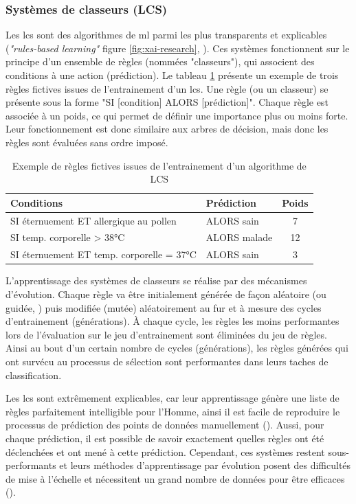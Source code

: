 \subsubsection{Systèmes de classeurs (LCS)}
Les \gls{lcs} sont des algorithmes de \gls{ml} parmi les plus transparents et explicables (\textit{"rules-based learning"} figure \ref{fig:xai-research}, \cite{arrieta_explainable_2019}). Ces systèmes fonctionnent sur le principe d'un ensemble de règles (nommées "classeurs"), qui associent des conditions à une action (prédiction). Le tableau \ref{table:lcs-rules} présente un exemple de trois règles fictives issues de l'entrainement d'un \gls{lcs}. Une règle (ou un classeur) se présente sous la forme "SI [condition] ALORS [prédiction]". Chaque règle est associée à un poids, ce qui permet de définir une importance plus ou moins forte. Leur fonctionnement est donc similaire aux arbres de décision, mais donc les règles sont évaluées sans ordre imposé.
\begin{table}[!ht]
\centering
\begin{tabular}{|l|l|c|} 
 \hline
 Conditions & Prédiction & Poids \\
 \hline
 SI éternuement ET allergique au pollen & ALORS sain & 7 \\ 
 SI temp. corporelle > 38°C & ALORS malade & 12 \\ 
 SI éternuement ET temp. corporelle = 37°C & ALORS sain & 3 \\ 

 \hline
\end{tabular}
\caption{Exemple de règles fictives issues de l'entrainement d'un algorithme de LCS}
\label{table:lcs-rules}
\end{table}

L'apprentissage des systèmes de classeurs se réalise par des mécanismes d'évolution. Chaque règle va être initialement générée de façon aléatoire (ou guidée, \cite{urbanowicz_relief-based_2018}) puis modifiée (mutée) aléatoirement au fur et à mesure des cycles d'entrainement (générations). À chaque cycle, les règles les moins performantes lors de l'évaluation sur le jeu d'entrainement sont éliminées du jeu de règles. Ainsi au bout d'un certain nombre de cycles (générations), les règles générées qui ont survécu au processus de sélection sont performantes dans leurs taches de classification.

Les \gls{lcs} sont extrêmement explicables, car leur apprentissage génère une liste de règles parfaitement intelligible pour l'Homme, ainsi il est facile de reproduire le processus de prédiction des points de données manuellement (\cite{arrieta_explainable_2019}). Aussi, pour chaque prédiction, il est possible de savoir exactement quelles règles ont été déclenchées et ont mené à cette prédiction. Cependant, ces systèmes restent sous-performants et leurs méthodes d'apprentissage par évolution posent des difficultés de mise à l'échelle et nécessitent un grand nombre de données pour être efficaces (\cite{urbanowicz_exstracs_2015}).

